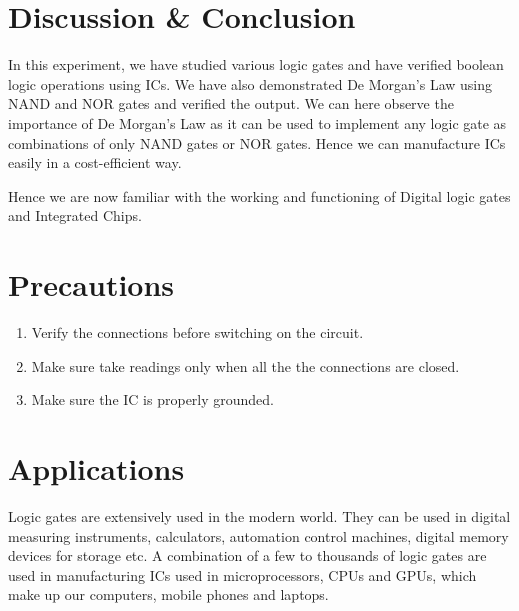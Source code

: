 \section{Discussion \& Conclusion}
In this experiment, we have studied various logic gates and have verified boolean logic operations using ICs. We have also demonstrated De Morgan's Law using NAND and NOR gates and verified the output. We can here observe the importance of De Morgan's Law as it can be used to implement any logic gate as combinations of only NAND gates or NOR gates. Hence we can manufacture ICs easily in a cost-efficient way. 

Hence we are now familiar with the working and functioning of Digital logic gates and Integrated Chips.

\section{Precautions}

\begin{enumerate}
    \item Verify the connections before switching on the circuit.
    \item Make sure take readings only when all the the connections are closed.
    \item Make sure the IC is properly grounded.
\end{enumerate}

\section{Applications}
Logic gates are extensively used in the modern world. They can be used in digital measuring instruments, calculators, automation control machines, digital memory devices for storage etc. A combination of a few to thousands of logic gates are used in manufacturing ICs used in microprocessors, CPUs and GPUs, which make up our computers, mobile phones and laptops.